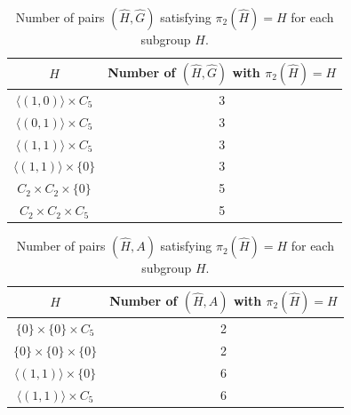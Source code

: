 \documentclass{article}
\begin{document}
\begin{enumerate}
\begin{table} 
\caption{Number of pairs $(\hat{H}, \hat{G})$ satisfying $\pi_2(\hat{H}) = H$ for each subgroup $H$.}\label{Table4}
\begin{tabular}{cc}
\toprule
$H$ & Number of $(\hat{H}, \hat{G})$ with $\pi_2(\hat{H}) = H$ \\ %
\midrule
$\langle (1,0) \rangle \times C_5$    & 3 \\
$\langle (0,1) \rangle \times C_5$    & 3 \\
$\langle (1,1) \rangle \times C_5$    & 3 \\
$\langle (1,1) \rangle \times \{0\}$  & 3 \\
$C_2 \times C_2 \times \{0\}$         & 5 \\
$C_2 \times C_2 \times C_5$           & 5 \\
\bottomrule
\end{tabular}
\end{table}

\begin{table} 
\caption{Number of pairs $(\hat{H}, A)$ satisfying $\pi_2(\hat{H}) = H$ for each subgroup $H$.}\label{Table5}
\begin{tabular}{cc}
\toprule
$H$ & Number of $(\hat{H}, A)$ with $\pi_2(\hat{H}) = H$ \\ %
\midrule
$\{0\} \times \{0\} \times C_5$ & 2 \\
$\{0\} \times \{0\} \times \{0\}$ & 2 \\
$\langle (1,1) \rangle \times \{0\}$ & 6 \\
$\langle (1,1) \rangle \times C_5$ & 6 \\
\bottomrule
\end{tabular}
\end{table}


\end{enumerate}
\end{document}
